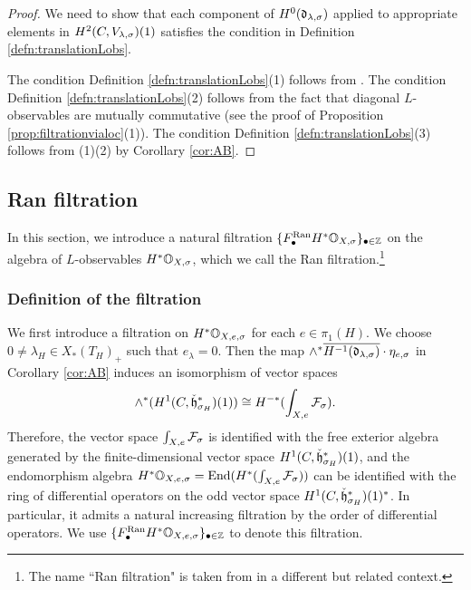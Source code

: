 \documentclass[reqno]{amsart}
\numberwithin{equation}{section}
\numberwithin{equation}{section}
\begin{document}
\begin{proof}
    We need to show that each component of $H^0(\mathfrak{d}_{\lambda,\sigma})$ applied to appropriate elements in $H^2(C, V_{\lambda,\sigma})(1)$ satisfies the condition in Definition \ref{defn:translationLobs}.
    
    The condition Definition \ref{defn:translationLobs}(1) follows from \cite[Lemma\,5.15]{wang2025specialcycleshtukascategorical}. The condition Definition \ref{defn:translationLobs}(2) follows from the fact that diagonal $L$-observables are mutually commutative (see the proof of Proposition \ref{prop:filtrationvialoc}(1)). The condition Definition \ref{defn:translationLobs}(3) follows from (1)(2) by Corollary \ref{cor:AB}.
\end{proof}


\subsection{Ran filtration}
In this section, we introduce a natural filtration $\{F_{\bullet}^{\mathrm{Ran}}H^*\mathbb{O}_{X,\sigma}\}_{\bullet\in \mathbb{Z}}$ on the algebra of $L$-observables $H^*\mathbb{O}_{X,\sigma}$, which we call the Ran filtration.\footnote{The name ``Ran filtration" is taken from \cite[\S5.5.4]{FYZvolume} in a different but related context.}

\subsubsection{Definition of the filtration}\label{sec:deffil}

We first introduce a filtration on $H^*\mathbb{O}_{X,e,\sigma}$ for each $e\in \pi_1(H)$. We choose $0\neq \lambda_H\in X_*(T_H)_+$ such that $e_{\lambda}=0$. Then the map $\wedge^*\overline{H^{-1}(\mathfrak{d}_{\lambda,\sigma})}\cdot \eta_{e,\sigma}$ in Corollary \ref{cor:AB} induces an isomorphism of vector spaces \[\wedge^*(H^1(C,\check{\mathfrak{h}}_{\sigma_H}^*)(1))\cong H^{-*}(\int_{X,e}\mathcal{F}_{\sigma}).\] Therefore, the vector space $\int_{X,e}\mathcal{F}_{\sigma}$ is identified with the free exterior algebra generated by the finite-dimensional vector space $H^1(C,\check{\mathfrak{h}}_{\sigma_H}^*)(1)$, and the endomorphism algebra $H^*\mathbb{O}_{X,e,\sigma}=\operatorname{End}(H^*(\int_{X,e}\mathcal{F}_{\sigma}))$ can be identified with the ring of differential operators on the odd vector space $H^1(C,\check{\mathfrak{h}}_{\sigma_H}^*)(1)^*$. In particular, it admits a natural increasing filtration by the order of differential operators. We use $\{F_{\bullet}^{\mathrm{Ran}}H^*\mathbb{O}_{X,e,\sigma}\}_{\bullet\in \mathbb{Z}}$ to denote this filtration.
\end{document}
